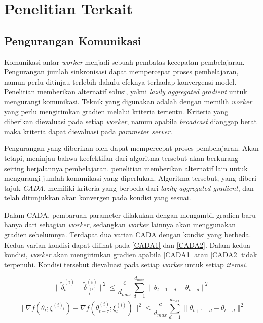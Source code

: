 \section{Penelitian Terkait}

\subsection{Pengurangan Komunikasi}
Komunikasi antar \emph{worker} menjadi sebuah pembatas kecepatan pembelajaran. Pengurangan jumlah sinkronisasi dapat mempercepat proses pembelajaran, namun perlu ditinjau terlebih dahulu efeknya terhadap konvergensi model. Penelitian \textcite{Chen2018LAG} memberikan alternatif solusi, yakni \emph{lazily aggregated gradient} untuk mengurangi komunikasi. Teknik yang digunakan adalah dengan memilih \emph{worker} yang perlu mengirimkan gradien melalui kriteria tertentu. Kriteria yang diberikan dievaluasi pada setiap \emph{worker}, namun apabila \emph{broadcast} dianggap berat maka kriteria dapat dievaluasi pada \emph{parameter server}.

Pengurangan yang diberikan oleh \textcite{Chen2018LAG} dapat mempercepat proses pembelajaran. Akan tetapi, \textcite{Chen2021CADA} meninjau bahwa keefektifan dari algoritma tersebut akan berkurang seiring berjalannya pembelajaran. penelitian \textcite{Chen2021CADA} memberikan alternatif lain untuk mengurangi jumlah komunikasi yang diperlukan. Algoritma tersebut, yang diberi tajuk \emph{CADA}, memiliki kriteria yang berbeda dari \emph{lazily aggregated gradient}, dan telah ditunjukkan akan konvergen pada kondisi yang sesuai.

Dalam CADA, pembaruan parameter dilakukan dengan mengambil gradien baru hanya dari sebagian \emph{worker}, sedangkan \emph{worker} lainnya akan menggunakan gradien sebelumnya. Terdapat dua varian CADA dengan kondisi yang berbeda. Kedua varian kondisi dapat dilihat pada \autoref{CADA1} dan \autoref{CADA2}. Dalam kedua kondisi, \emph{worker} akan mengirimkan gradien apabila \autoref{CADA1} atau \autoref{CADA2} tidak terpenuhi. Kondisi tersebut dievaluasi pada setiap \emph{worker} untuk setiap \emph{iterasi}.

\begin{equation}
  \label{CADA1}
  \|\tilde{\delta}_t^{(i)} - \tilde{\delta}^{(i)}_{\tau_t^{(i)}}\|^2 \leq \frac{c}{d_{max}} \sum_{d=1}^{d_{max}} \|\theta_{t+1-d} - \theta_{t-d}\|^2
\end{equation}
\begin{equation}
  \label{CADA2}
  \|\nabla f(\theta_t;\xi^{(i)_t}) - \nabla f(\theta_{t-\tau}^{(i)};\xi_t^{(i)})\|^2 \leq \frac{c}{d_{max}} \sum_{d=1}^{d_{max}} \|\theta_{t+1-d} - \theta_{t-d}\|^2
\end{equation}

